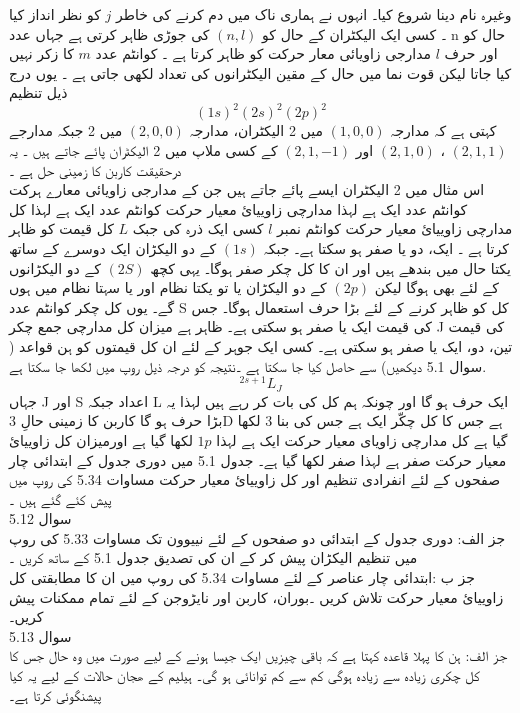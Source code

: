    وغیرہ نام دینا شروع کیا۔ انہوں نے ہماری ناک میں دم کرنے کی خاطر 
  \(j\)
    کو نظر انداز کیا ۔ کسی ایک الیکٹران کے حال کو
    \( (n,l)\) 
    کی جوڑی ظاہر کرتی ہے جہاں عدد n حال کو اور حرف
    \(l\)
      مدارجی زاویائی معار حرکت کو ظاہر کرتا ہے ۔ کوانٹم عدد
   \(m\) 
      کا زکر نہیں کیا جاتا لیکن قوت نما میں حال کے مقین الیکٹرانوں کی تعداد لکھی جاتی ہے ۔ یوں درج ذیل تنظیم 
\[(1s)^{2}(2s)^{2}(2p)^{2} \]
کہتی ہے کہ مدارجہ
\((1,0,0)\)
 میں 2 الیکٹران، 
مدارجہ
\(( 2,0,0)\) 
میں 2 جبکہ مدارجے
\(( 2,1,1)\)
، 
\((2,1,0)\) 
اور
 \((2,1,-1)\) 
کے کسی ملاپ میں 2 الیکٹران پائے جاتے ہیں ۔ یہ درحقیقت کاربن کا زمینی حل ہے ۔ \\
اس مثال میں 2 الیکٹران ایسے پائے جاتے ہیں جن کے مدارجی زاویائی معارے ہرکت کوانٹم  عدد ایک ہے لہذا مدارچی زاوییائ معیار حرکت کوانٹم عدد ایک ہے لہذا کل مدارچی زاوییائ معیار حرکت کوانٹم نمبر 
\(l\)
کسی ایک ذرہ کی جبک
\(L\)
کل قیمت کو ظاہر کرتا ہے ۔ ایک، دو یا صفر ہو  سکتا ہے۔ جبکہ
 \((1s)\) 
کے دو الیکڑان ایک دوسرے کے ساتھ یکتا حال میں بندھے ہیں اور ان کا کل چکر صفر ہوگا۔ یہی کچھ
\(( 2S)\)
 کے دو الیکڑانوں کے لئے بھی ہوگا لیکن
 \((2p)\)
 کے دو الیکڑان یا تو یکتا نظام اور یا سہتا نظام میں ہوں گے۔ یوں کل چکر کوانٹم عدد S کل کو ظاہر کرنے کے لئے بڑا حرف استعمال ہوگا۔ جس کی قیمت ایک یا صفر ہو سکتی ہے۔ ظاہر ہے میزان کل مدارچی جمع چکر J کی قیمت تین، دو، ایک یا صفر ہو سکتی ہے۔ کسی ایک جوہر کے لئے ان کل قیمتوں کو ہن قواعد ( سوال 5.1 دیکھیں)  سے حاصل کیا جا سکتا ہے ۔نتیجہ کو درجہ ذیل روپ میں لکھا جا سکتا ہے. 
 \[^{2s+1}L_{J}\]
  جہاں J اور S اعداد جبکہ L ایک حرف ہو گا اور چونکہ ہم کل کی بات کر رہے ہیں لہذا یہ بڑا حرف ہو گا کاربن کا زمینی حالِ 3D ہے جس کا کل چکّر ایک ہے جس کی بنا 3 لکھا گیا ہے کل مدارچی زاویای معیار حرکت ایک ہے لہذا
  \(1p\) 
  لکھا گیا ہے اورمیزان  کل زاوییائ معیار حرکت صفر ہے لہذا صفر لکھا گیا ہے۔ جدول  5.1 میں دوری جدول کے ابتدائی چار صفحوں کے لئے انفرادی  تنظیم اور کل زاوییائ معیار حرکت مساوات 5.34 کی روپ میں پیش کئے گئے ہیں ۔ \\
  سوال 5.12 \\
  جز الف: دوری جدول کے ابتدائی  دو صفحوں  کے لئے نییوون تک مساوات 5.33 کی روپ میں تنظیم الیکڑان پیش کر کے ان کی تصدیق جدول 5.1 کے ساتھ کریں ۔ \\
  جز ب :ابتدائی  چار عناصر  کے لئے مساوات  5.34 کی روپ میں ان کا مطابقتی کل زاوییائ معیار حرکت تلاش کریں ۔بوران، کاربن اور نایڑوجن کے لئے تمام ممکنات پیش کریں۔\\
   سوال 5.13\\ 
   جز الف: ہن کا پہلا قاعدہ کہتا ہے کہ باقی چیزیں ایک جیسا ہونے کے لیے صورت میں وہ حال جس کا کل چکری زیادہ سے زیادہ ہوگی کم سے کم توانائی ہو گی۔ ہیلیم کے ھجان حالات کے لیے یہ کیا پیشنگوئی کرتا ہے۔\\
